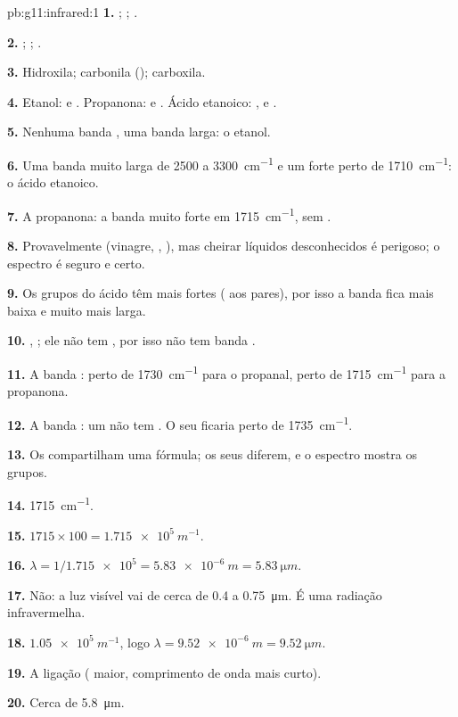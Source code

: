 \begin{solution}{pb:g11:infrared:1}
\textbf{1.} ; ; .

\textbf{2.} ; ; .

\textbf{3.} Hidroxila; carbonila (); carboxila.

\textbf{4.} Etanol:  e . Propanona:  e
. Ácido etanoico: ,  e .

\textbf{5.} Nenhuma banda , uma banda  larga: o etanol.

\textbf{6.} Uma banda  muito larga de 2500 a \qty{3300}{cm^{-1}}
e um  forte perto de \qty{1710}{cm^{-1}}: o ácido etanoico.

\textbf{7.} A propanona: a banda  muito forte em
\qty{1715}{cm^{-1}}, sem .

\textbf{8.} Provavelmente (vinagre, , ), mas cheirar
líquidos desconhecidos é perigoso; o espectro é seguro e certo.

\textbf{9.} Os grupos  do ácido têm  mais
fortes ( aos pares), por isso a banda fica mais baixa e muito
mais larga.

\textbf{10.} , ; ele não tem , por isso
não tem banda .

\textbf{11.} A banda : perto de \qty{1730}{cm^{-1}} para o
propanal, perto de \qty{1715}{cm^{-1}} para a propanona.

\textbf{12.} A banda : um  não tem . O seu 
ficaria perto de \qty{1735}{cm^{-1}}.

\textbf{13.} Os  compartilham uma fórmula; os seus  diferem, e o espectro mostra os grupos.

\textbf{14.} \qty{1715}{cm^{-1}}.

\textbf{15.} $1715 \times 100 = \qty{1.715e5}{m^{-1}}$.

\textbf{16.} $\lambda = 1/\num{1.715e5} = \qty{5.83e-6}{m} =
\qty{5.83}{\micro m}$.

\textbf{17.} Não: a luz visível vai de cerca de 0.4 a
\qty{0.75}{\micro m}. É uma radiação infravermelha.

\textbf{18.} $\num{1.05e5}\ \si{m^{-1}}$, logo $\lambda = \qty{9.52e-6}{m}
= \qty{9.52}{\micro m}$.

\textbf{19.} A ligação  ( maior, comprimento de
onda mais curto).

\textbf{20.} Cerca de \qty{5.8}{\micro m}.
\end{solution}
